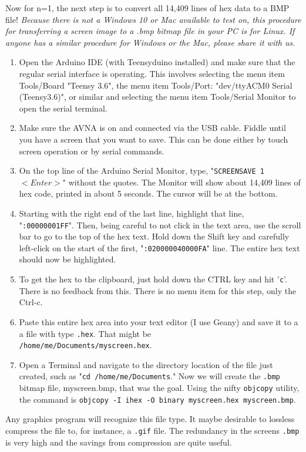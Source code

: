 \begin{description}
Now for n=1, the next step is to convert all 14,409 lines of hex data to a BMP file!   \textit{Because there is not a Windows 10 or Mac available to test on, this procedure for transferring a screen image to a .bmp bitmap file in your PC is for Linux. If anyone has a similar procedure for Windows or the Mac, please share it with us.}

\begin{enumerate}
\item Open the Arduino IDE (with Teensyduino installed) and make sure that the regular serial interface is operating. This involves selecting the menu item Tools/Board "Teensy 3.6", the menu item Tools/Port: "dev/ttyACM0 Serial (Teensy3.6)", or similar and selecting the menu item Tools/Serial Monitor to open the serial terminal.

\item Make sure the AVNA is on and connected via the USB cable. Fiddle until you have a screen that you want to save. This can be done either by touch screen operation or by serial commands.

\item On the top line of the Arduino Serial Monitor, type, "\texttt{SCREENSAVE 1} $<Enter>$" without the quotes. The Monitor will show about 14,409 lines of hex code, printed in about 5 seconds. The cursor will be at the bottom.

\item Starting with the right end of the last line, highlight that line, "\texttt{:00000001FF}". Then, being careful to not click in the text area, use the scroll bar to go to the top of the hex text. Hold down the Shift key and carefully left-click on the start of the first, "\texttt{:020000040000FA}" line. The entire hex text should now be highlighted.

\item To get the hex to the clipboard, just hold down the CTRL key and hit '\texttt{c}'. There is no feedback from this. There is no menu item for this step, only the Ctrl-c.

\item Paste this entire hex area into your text editor (I use Geany) and save it to a a file with type \texttt{.hex}. That might be \\ \texttt{/home/me/Documents/myscreen.hex}.

\item Open a Terminal and navigate to the directory location of the file just created, such as "\texttt{cd /home/me/Documents}." Now we will create the \texttt{.bmp} bitmap file, myscreen.bmp, that was the goal. Using the nifty \texttt{objcopy} utility, the command is \texttt{objcopy -I ihex -O binary myscreen.hex myscreen.bmp}.

\end{enumerate}
\end{description}
Any graphics program will recognize this file type. It maybe desirable to lossless compress the file to, for instance, a \texttt{.gif} file. The redundancy in the screens \texttt{.bmp} is very high and the savings from compression are quite useful.

